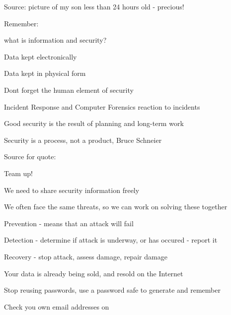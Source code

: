 \documentclass[Screen16to9,17pt]{foils}
\begin{document}
Source: picture of my son less than 24 hours old - precious!


\begin{list1}
\item Remember:
\begin{list2}
\item what is information and security?
\item Data kept electronically
\item Data kept in physical form
\item Dont forget the human element of security
\end{list2}
\item Incident Response and Computer Forensics reaction to incidents
\item Good security is the result of planning and long-term work
\end{list1}
\vskip 1cm
\centerline{\color{titlecolor}\LARGE Security is a process, not a product, Bruce Schneier}

Source for quote: 




\begin{list1}
\item Team up!
\item We need to share security information freely
\item We often face the same threats, so we can work on solving these together
\end{list1}


\begin{list1}
\item Prevention - means that an attack will fail
\item Detection - determine if attack is underway, or has occured - report it
\item Recovery - stop attack, assess damage, repair damage
\end{list1}




\begin{list1}
\item Your data is already being sold, and resold on the Internet
\item Stop reusing passwords, use a password safe to generate and remember
\item Check you own email addresses on 
\end{list1}
\end{document}
